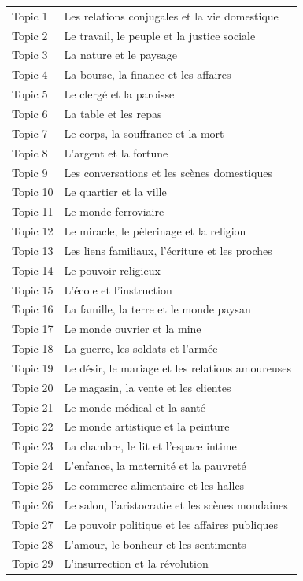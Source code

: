 \begin{longtable}{p{2cm}p{11cm}}
Topic 1 & Les relations conjugales et la vie domestique \\
Topic 2 & Le travail, le peuple et la justice sociale \\
Topic 3 & La nature et le paysage \\
Topic 4 & La bourse, la finance et les affaires \\
Topic 5 & Le clergé et la paroisse \\
Topic 6 & La table et les repas \\
Topic 7 & Le corps, la souffrance et la mort \\
Topic 8 & L'argent et la fortune \\
Topic 9 & Les conversations et les scènes domestiques \\
Topic 10 & Le quartier et la ville \\
Topic 11 & Le monde ferroviaire \\
Topic 12 & Le miracle, le pèlerinage et la religion \\
Topic 13 & Les liens familiaux, l'écriture et les proches \\
Topic 14 & Le pouvoir religieux \\
Topic 15 & L'école et l'instruction \\
Topic 16 & La famille, la terre et le monde paysan \\
Topic 17 & Le monde ouvrier et la mine \\
Topic 18 & La guerre, les soldats et l'armée \\
Topic 19 & Le désir, le mariage et les relations amoureuses \\
Topic 20 & Le magasin, la vente et les clientes \\
Topic 21 & Le monde médical et la santé \\
Topic 22 & Le monde artistique et la peinture \\
Topic 23 & La chambre, le lit et l'espace intime \\
Topic 24 & L'enfance, la maternité et la pauvreté \\
Topic 25 & Le commerce alimentaire et les halles \\
Topic 26 & Le salon, l'aristocratie et les scènes mondaines \\
Topic 27 & Le pouvoir politique et les affaires publiques \\
Topic 28 & L'amour, le bonheur et les sentiments \\
Topic 29 & L'insurrection et la révolution \\

\bottomrule
\end{longtable}

